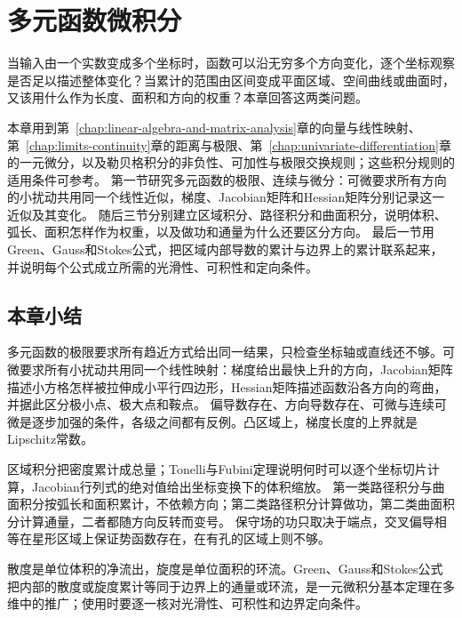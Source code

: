 \chapter{多元函数微积分}
\label{chap:multivariate-calculus}
\label{chap:multivariable-functions}

当输入由一个实数变成多个坐标时，函数可以沿无穷多个方向变化，逐个坐标观察是否足以描述整体变化？当累计的范围由区间变成平面区域、空间曲线或曲面时，又该用什么作为长度、面积和方向的权重？本章回答这两类问题。

本章用到第~\ref{chap:linear-algebra-and-matrix-analysis}章的向量与线性映射、第~\ref{chap:limits-continuity}章的距离与极限、第~\ref{chap:univariate-differentiation}章的一元微分，以及勒贝格积分的非负性、可加性与极限交换规则；这些积分规则的适用条件可参考。
第一节研究多元函数的极限、连续与微分：可微要求所有方向的小扰动共用同一个线性近似，梯度、Jacobian矩阵和Hessian矩阵分别记录这一近似及其变化。
随后三节分别建立区域积分、路径积分和曲面积分，说明体积、弧长、面积怎样作为权重，以及做功和通量为什么还要区分方向。
最后一节用Green、Gauss和Stokes公式，把区域内部导数的累计与边界上的累计联系起来，并说明每个公式成立所需的光滑性、可积性和定向条件。







\FloatBarrier
\section{本章小结}
\label{sec:multivariable-summary}

多元函数的极限要求所有趋近方式给出同一结果，只检查坐标轴或直线还不够。可微要求所有小扰动共用同一个线性映射：梯度给出最快上升的方向，Jacobian矩阵描述小方格怎样被拉伸成小平行四边形，Hessian矩阵描述函数沿各方向的弯曲，并据此区分极小点、极大点和鞍点。
偏导数存在、方向导数存在、可微与连续可微是逐步加强的条件，各级之间都有反例。凸区域上，梯度长度的上界就是Lipschitz常数。

区域积分把密度累计成总量；Tonelli与Fubini定理说明何时可以逐个坐标切片计算，Jacobian行列式的绝对值给出坐标变换下的体积缩放。
第一类路径积分与曲面积分按弧长和面积累计，不依赖方向；第二类路径积分计算做功，第二类曲面积分计算通量，二者都随方向反转而变号。
保守场的功只取决于端点，交叉偏导相等在星形区域上保证势函数存在，在有孔的区域上则不够。

散度是单位体积的净流出，旋度是单位面积的环流。Green、Gauss和Stokes公式把内部的散度或旋度累计等同于边界上的通量或环流，是一元微积分基本定理在多维中的推广；使用时要逐一核对光滑性、可积性和边界定向条件。
